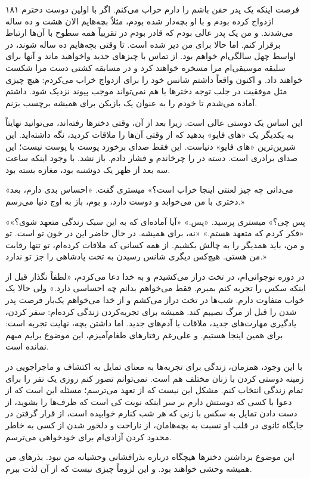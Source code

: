 ۱۸۱  
فرصت اینکه یک پدر خفن باشم را دارم خراب می‌کنم. اگر با اولین دوست دخترم ازدواج کرده بودم و با او بچه‌دار شده بودم، مثلاً بچه‌هایم الان هشت و ده ساله می‌شدند. و من یک پدر عالی بودم که قادر بودم در تقریباً همه سطوح با آن‌ها ارتباط برقرار کنم. اما حالا برای من دیر شده است. تا وقتی بچه‌هایم ده ساله شوند، در اواسط چهل سالگی‌ام خواهم بود. از تماس با چیزهای جدید واخواهید ماند و آنها برای سلیقه موسیقی‌ام مرا مسخره خواهند کرد و در مسابقه کشتی دست مرا شکست خواهند داد. و اکنون واقعاً داشتم شانس خود را برای ازدواج خراب می‌کردم: هیچ چیزی مثل موفقیت در جلب توجه دخترها با هم نمی‌تواند موجب پیوند نزدیک شود. داشتم آماده می‌شدم تا خودم را به عنوان یک بازیکن برای همیشه برچسب بزنم.

این اساس یک دوستی عالی است. زیرا بعد از آن، وقتی دخترها رفته‌اند، می‌توانید نهایتاً به یکدیگر یک «های فایو» بدهید که از وقتی آن‌ها را ملاقات کردید، نگه داشته‌اید. این شیرین‌ترین «های فایو» دنیاست. این فقط صدای برخورد پوست با پوست نیست؛ این صدای برادری است. دسته در را چرخاندم و فشار دادم. باز نشد. با وجود اینکه ساعت سه بعد از ظهر یک دوشنبه بود، مغازه بسته بود.

«می‌دانی چه چیز لعنتی اینجا خراب است؟» میستری گفت. «احساس بدی دارم، بعد دختری با من می‌خوابد و دوست دارد، و بوم، باز به اوج دنیا می‌رسم.»

«پس چی؟» میستری پرسید.  
«پس.»  
«آیا آماده‌ای که به این سبک زندگی متعهد شوی؟»  
«فکر کردم که متعهد هستم.»  
«نه، برای همیشه. در حال حاضر این در خون تو است. تو و من، باید همدیگر را به چالش بکشیم. از همه کسانی که ملاقات کرده‌ام، تو تنها رقابت من هستی. هیچ‌کس دیگری شانس رسیدن به تخت پادشاهی را جز تو ندارد.»

در دوره نوجوانی‌ام، در تخت دراز می‌کشیدم و به خدا دعا می‌کردم، «لطفاً نگذار قبل از اینکه سکس را تجربه کنم بمیرم. فقط می‌خواهم بدانم چه احساسی دارد.» ولی حالا یک خواب متفاوت دارم. شب‌ها در تخت دراز می‌کشم و از خدا می‌خواهم یک‌بار فرصت پدر شدن را قبل از مرگ نصیبم کند. همیشه برای تجربه‌کردن زندگی کرده‌ام: سفر کردن، یادگیری مهارت‌های جدید، ملاقات با آدم‌های جدید. اما داشتن بچه، نهایت تجربه است: برای همین اینجا هستیم. و علی‌رغم رفتارهای طغام‌آمیزم، این موضوع برایم مبهم نمانده است.

با این وجود، همزمان، زندگی برای تجربه‌ها به معنای تمایل به اکتشاف و ماجراجویی در زمینه دوستی کردن با زنان مختلف هم است. نمی‌توانم تصور کنم روزی یک نفر را برای تمام زندگی انتخاب کنم. مشکل این نیست که از تعهد می‌ترسم؛ مسئله این است که از دعوا با کسی که دوستش دارم بر سر اینکه نوبت کی است که ظرف‌ها را بشوید، از دست دادن تمایل به سکس با زنی که هر شب کنارم خوابیده است، از قرار گرفتن در جایگاه ثانوی در قلب او نسبت به بچه‌هامان، از ناراحت و دلخور شدن از کسی به خاطر محدود کردن آزادی‌ام برای خودخواهی می‌ترسم.

این موضوع برداشتن دخترها هیچگاه درباره بذرافشانی وحشیانه من نبود. بذرهای من همیشه وحشی خواهند بود. و این لزوماً چیزی نیست که از آن لذت ببرم.